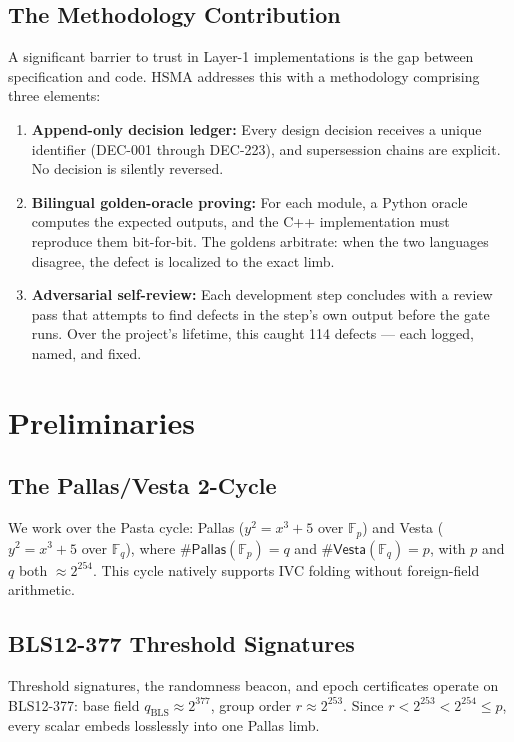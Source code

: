 \documentclass[11pt,a4paper]{article}
\begin{document}
\subsection{The Methodology Contribution}

A significant barrier to trust in Layer-1 implementations is the gap
between specification and code. HSMA addresses this with a methodology
 comprising three elements:

\begin{enumerate}
\item \textbf{Append-only decision ledger:} Every design decision
  receives a unique identifier (DEC-001 through DEC-223), and
  supersession chains are explicit. No decision is silently reversed.
\item \textbf{Bilingual golden-oracle proving:} For each module, a
  Python oracle computes the expected outputs, and the C++
  implementation must reproduce them bit-for-bit. The goldens arbitrate:
  when the two languages disagree, the defect is localized to the
  exact limb.
\item \textbf{Adversarial self-review:} Each development step concludes
  with a review pass that attempts to find defects in the step's own
  output before the gate runs. Over the project's lifetime, this
  caught 114 defects --- each logged, named, and fixed.
\end{enumerate}

\section{Preliminaries}

\subsection{The Pallas/Vesta 2-Cycle}

We work over the Pasta cycle: Pallas ($y^2 = x^3 + 5$ over
 $\mathbb{F}_p$) and Vesta ($y^2 = x^3 + 5$ over $\mathbb{F}_q$),
where $\#\textsf{Pallas}(\mathbb{F}_p) = q$ and
 $\#\textsf{Vesta}(\mathbb{F}_q) = p$, with $p$ and $q$ both
 $\approx 2^{254}$. This cycle natively supports IVC folding without
foreign-field arithmetic.

\subsection{BLS12-377 Threshold Signatures}

Threshold signatures, the randomness beacon, and epoch certificates
operate on BLS12-377: base field $q_{\text{BLS}} \approx 2^{377}$,
group order $r \approx 2^{253}$. Since $r < 2^{253} < 2^{254} \le p$,
every scalar embeds losslessly into one Pallas limb.
\end{document}
